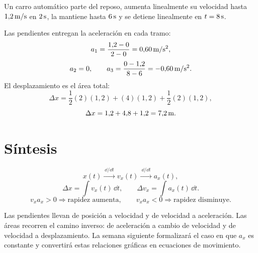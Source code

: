 \documentclass[11pt]{article}
\begin{document}
Un carro automático parte del reposo, aumenta linealmente su velocidad hasta
\(1{,}2\,\mathrm{m/s}\) en \(2\,\mathrm{s}\), la mantiene hasta
\(6\,\mathrm{s}\) y se detiene linealmente en \(t=8\,\mathrm{s}\).

\begin{center}
\end{center}

Las pendientes entregan la aceleración en cada tramo:
\[
  a_1
  =
  \frac{1{,}2-0}{2-0}
  =
  0{,}60\,\mathrm{m/s^2},
\]
\[
  a_2=0,
  \qquad
  a_3
  =
  \frac{0-1{,}2}{8-6}
  =
  -0{,}60\,\mathrm{m/s^2}.
\]
El desplazamiento es el área total:
\[
  \Delta x
  =
  \frac12(2)(1{,}2)
  +(4)(1{,}2)
  +\frac12(2)(1{,}2),
\]
\[
  \Delta x
  =
  1{,}2+4{,}8+1{,}2
  =
  7{,}2\,\mathrm{m}.
\]



\section{Síntesis}

\[
  x(t)
  \xrightarrow{\ \dd/\dd t\ }
  v_x(t)
  \xrightarrow{\ \dd/\dd t\ }
  a_x(t),
\]
\[
  \Delta x=\int v_x(t)\,\dd t,
  \qquad
  \Delta v_x=\int a_x(t)\,\dd t.
\]
\[
  v_xa_x>0
  \Longrightarrow
  \text{rapidez aumenta},
  \qquad
  v_xa_x<0
  \Longrightarrow
  \text{rapidez disminuye}.
\]

Las pendientes llevan de posición a velocidad y de velocidad a aceleración.
Las áreas recorren el camino inverso: de aceleración a cambio de velocidad y
de velocidad a desplazamiento. La semana siguiente formalizará el caso en que
\(a_x\) es constante y convertirá estas relaciones gráficas en ecuaciones de
movimiento.
\end{document}

